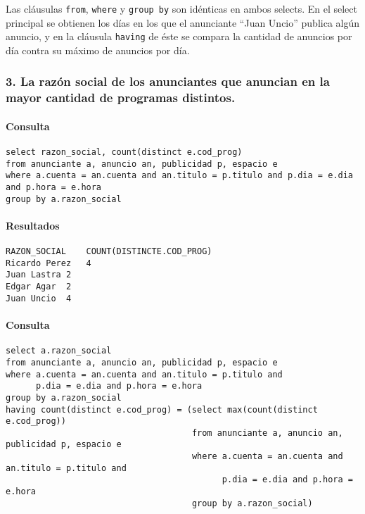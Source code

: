 Las cl\'ausulas \verb|from|, \verb|where| y \verb|group by| son id\'enticas en ambos selects. En el select principal se obtienen los d\'ias en los que el anunciante ``Juan Uncio'' publica alg\'un anuncio, y en la cl\'ausula \verb|having| de \'este se compara la cantidad de anuncios por d\'ia contra su m\'aximo de anuncios por d\'ia. \\

\subsubsection*{3. La raz\'on social de los anunciantes que anuncian en la mayor cantidad de programas distintos.}

\paragraph{Consulta}
\begin{verbatim} 
select razon_social, count(distinct e.cod_prog)
from anunciante a, anuncio an, publicidad p, espacio e
where a.cuenta = an.cuenta and an.titulo = p.titulo and p.dia = e.dia and p.hora = e.hora
group by a.razon_social
\end{verbatim}

\paragraph{Resultados}
\begin{verbatim} 
RAZON_SOCIAL	COUNT(DISTINCTE.COD_PROG)
Ricardo Perez	4
Juan Lastra	2
Edgar Agar	2
Juan Uncio	4
\end{verbatim} 

\paragraph{Consulta}
\begin{verbatim} 
select a.razon_social
from anunciante a, anuncio an, publicidad p, espacio e
where a.cuenta = an.cuenta and an.titulo = p.titulo and 
      p.dia = e.dia and p.hora = e.hora
group by a.razon_social
having count(distinct e.cod_prog) = (select max(count(distinct e.cod_prog))
                                     from anunciante a, anuncio an, publicidad p, espacio e
                                     where a.cuenta = an.cuenta and an.titulo = p.titulo and 
                                           p.dia = e.dia and p.hora = e.hora
                                     group by a.razon_social)
\end{verbatim}

